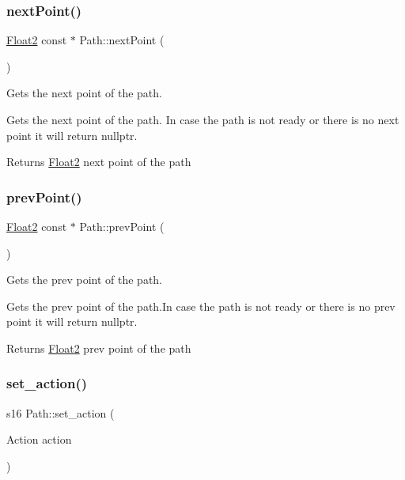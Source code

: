 \subsubsection{\texorpdfstring{next\+Point()}{nextPoint()}}
{\footnotesize\ttfamily \mbox{\hyperlink{class_float2}{Float2}} const  $\ast$ Path\+::next\+Point (\begin{DoxyParamCaption}{ }\end{DoxyParamCaption})}



Gets the next point of the path. 

Gets the next point of the path. In case the path is not ready or there is no next point it will return nullptr.

\begin{DoxyReturn}{Returns}
\mbox{\hyperlink{class_float2}{Float2}} next point of the path 
\end{DoxyReturn}
\mbox{\label{class_path_af5da5742823a638b5bf9100b3f0b37ea}} 
\subsubsection{\texorpdfstring{prev\+Point()}{prevPoint()}}
{\footnotesize\ttfamily \mbox{\hyperlink{class_float2}{Float2}} const  $\ast$ Path\+::prev\+Point (\begin{DoxyParamCaption}{ }\end{DoxyParamCaption})}



Gets the prev point of the path. 

Gets the prev point of the path.\+In case the path is not ready or there is no prev point it will return nullptr.

\begin{DoxyReturn}{Returns}
\mbox{\hyperlink{class_float2}{Float2}} prev point of the path 
\end{DoxyReturn}
\mbox{\label{class_path_a94fc077d91eb4440744713303309fe4d}} 
\subsubsection{\texorpdfstring{set\+\_\+action()}{set\_action()}\hspace{0.1cm}{\footnotesize\ttfamily [1/2]}}
{\footnotesize\ttfamily s16 Path\+::set\+\_\+action (\begin{DoxyParamCaption}\item[{Action}]{action }\end{DoxyParamCaption})}



